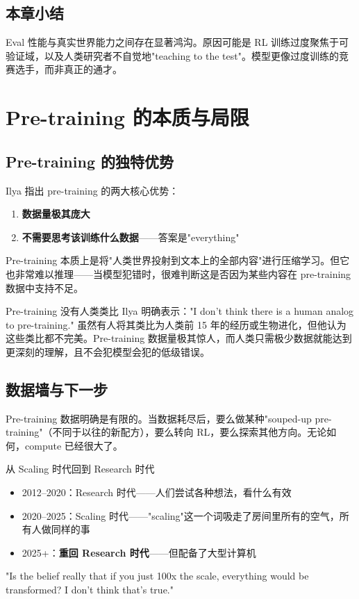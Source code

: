 \documentclass[a4paper]{article}
\begin{document}
\subsection{本章小结}

Eval 性能与真实世界能力之间存在显著鸿沟。原因可能是 RL 训练过度聚焦于可验证域，以及人类研究者不自觉地"teaching to the test"。模型更像过度训练的竞赛选手，而非真正的通才。


\section{Pre-training 的本质与局限}

\subsection{Pre-training 的独特优势}

Ilya 指出 pre-training 的两大核心优势：
\begin{enumerate}
    \item \textbf{数据量极其庞大}
    \item \textbf{不需要思考该训练什么数据}——答案是"everything"
\end{enumerate}

Pre-training 本质上是将"人类世界投射到文本上的全部内容"进行压缩学习。但它也非常难以推理——当模型犯错时，很难判断这是否因为某些内容在 pre-training 数据中支持不足。

\begin{warningbox}{Pre-training 没有人类类比}
Ilya 明确表示："I don't think there is a human analog to pre-training." 虽然有人将其类比为人类前 15 年的经历或生物进化，但他认为这些类比都不完美。Pre-training 数据量极其惊人，而人类只需极少数据就能达到更深刻的理解，且不会犯模型会犯的低级错误。
\end{warningbox}

\subsection{数据墙与下一步}

Pre-training 数据明确是有限的。当数据耗尽后，要么做某种"souped-up pre-training"（不同于以往的新配方），要么转向 RL，要么探索其他方向。无论如何，compute 已经很大了。

\begin{importantbox}{从 Scaling 时代回到 Research 时代}
\begin{itemize}
    \item 2012--2020：Research 时代——人们尝试各种想法，看什么有效
    \item 2020--2025：Scaling 时代——"scaling"这一个词吸走了房间里所有的空气，所有人做同样的事
    \item 2025+：\textbf{重回 Research 时代}——但配备了大型计算机
\end{itemize}
"Is the belief really that if you just 100x the scale, everything would be transformed? I don't think that's true."
\end{importantbox}
\end{document}
